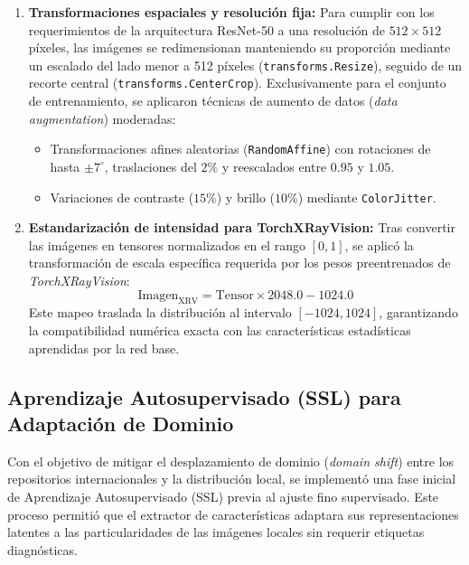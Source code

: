 \documentclass[../main.tex]{subfiles}
\begin{document}
\begin{enumerate}
    \item \textbf{Transformaciones espaciales y resolución fija:} Para cumplir con los requerimientos de la arquitectura ResNet-50 a una resolución de $512 \times 512$ píxeles, las imágenes se redimensionan manteniendo su proporción mediante un escalado del lado menor a 512 píxeles (\texttt{transforms.Resize}), seguido de un recorte central (\texttt{transforms.CenterCrop}). Exclusivamente para el conjunto de entrenamiento, se aplicaron técnicas de aumento de datos (\textit{data augmentation}) moderadas:
    \begin{itemize}
        \item Transformaciones afines aleatorias (\texttt{RandomAffine}) con rotaciones de hasta $\pm 7^\circ$, traslaciones del $2\%$ y reescalados entre $0.95$ y $1.05$.
        \item Variaciones de contraste ($15\%$) y brillo ($10\%$) mediante \texttt{ColorJitter}.
    \end{itemize}
    
    \item \textbf{Estandarización de intensidad para TorchXRayVision:} Tras convertir las imágenes en tensores normalizados en el rango $[0, 1]$, se aplicó la transformación de escala específica requerida por los pesos preentrenados de \textit{TorchXRayVision}:
    $$\text{Imagen}_{\text{XRV}} = \text{Tensor} \times 2048.0 - 1024.0$$
    Este mapeo traslada la distribución al intervalo $[-1024, 1024]$, garantizando la compatibilidad numérica exacta con las características estadísticas aprendidas por la red base.
\end{enumerate}

\subsection{Aprendizaje Autosupervisado (SSL) para Adaptación de Dominio}
\label{Seccion SSL}

Con el objetivo de mitigar el desplazamiento de dominio (\textit{domain shift}) entre los repositorios internacionales y la distribución local, se implementó una fase inicial de Aprendizaje Autosupervisado (SSL) previa al ajuste fino supervisado. Este proceso permitió que el extractor de características adaptara sus representaciones latentes a las particularidades de las imágenes locales sin requerir etiquetas diagnósticas.
\end{document}
